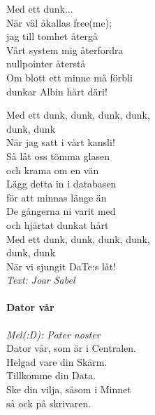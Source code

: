 \documentclass[12pt]{article}
\begin{document}
\begin{minipage}{.45\textwidth}
	\noindent
	Med ett dunk...\\
	
	När väl åkallas free(me);\\
	jag till tomhet återgå\\
	Vårt system mig återfordra\\
	nullpointer återstå\\
	Om blott ett minne må förbli\\
	dunkar Albin hårt däri!\\
	
	
\end{minipage}%
\hspace{.1\textwidth}
\noindent
\begin{minipage}{.45\textwidth}
	
	Med ett dunk, dunk, dunk, dunk,\\
	dunk, dunk\\
	När jag satt i vårt kansli!\\

	\noindent
	Så låt oss tömma glasen\\
	och krama om en vän\\
	Lägg detta in i databasen\\
	för att minnas länge än\\
	De gångerna ni varit med\\
	och hjärtat dunkat hårt\\

	\noindent
	Med ett dunk, dunk, dunk, dunk,\\
	dunk, dunk\\
	När vi sjungit DaTe:s låt!\\
	
	\textit{Text: Joar Sabel}\\
	
	\noindent
	\paragraph*{Dator vår\\}
	\vspace{3px}
	\textit{Mel(:D): Pater noster}\\	
	
	Dator vår, som är i Centralen.\\
	Helgad vare din Skärm.\\
	Tillkomme din Data.\\
	Ske din vilja, såsom i Minnet\\
	så ock på skrivaren.\\
	

\end{minipage}
\end{document}
